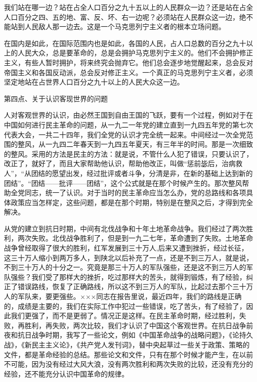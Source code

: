 我们站在哪一边？站在占全人口百分之九十五以上的人民群众一边？还是站在占全人口百分之四、五的地、富、反、坏、右一边呢？必须站在人民群众这一边，绝不能站到人民敌人那一边去。这是一个马克思列宁主义者的根本立场问题。

在国内是如此，在国际范围内也是如此，各国的人民，占人口总数的百分之九十以上的人民大众，总是要革命的，总是会拥护马克思列宁主义的。他们不会拥护修正主义，有些人暂时拥护，将来终究会抛弃它。他们总会逐步地觉醒起来，总会反对帝国主义和各国反动派，总会反对修正主义。一个真正的马克思列宁主义者，必须坚定地站在占世界人口百分之九十以上的人民大众这一边。

第四点、关于认识客现世界的问题

人对客观世界的认识，由必然王国到自由王国的飞跃，要有一个过程，例如对于在中国如何进行民主革命的问题，从一九二一年党的建立直到一九四五年党的第七次代表大会，一共二十四年，我们全党的认识才完全统一起来。中间经过一次全党范围的整风，从一九四二年春天到一九四五年夏天，有三年半的时间。那是一次细致的整风。采用的方法是民主的方法：就是说，不管什么人犯了错误，只要认识了，改正了，就好了，而且大家帮助他认识，帮助他改正，叫做“惩前毖后，治病救人”，“从团结的愿望出发，经过批评或者斗争，分清是非，在新的基础上达到新的团结”。“团结——批评——团结”，这个公式就是在那个时候产生的。那次整风帮助全党同志，统一了认识。对于当时的民主革命应当怎么办，党的总路线和各项具体政策应当怎样定，这些问题，都是在那个时期，特别是在整风之后，才得到完全解决。

从党的建立到抗日时期，中间有北伐战争和十年土地革命战争。我们经过了两次胜利，两次失败。北伐战争胜利了，但是到一九二七年，革命遭到了失败。土地革命战争曾经取得了很大的胜利，红军发展到三十万人,后来又遭到挫折，经过长征，这三十万人缩小到两万多人，到陕北以后补充了一点，还是不到三万人，就是说，不到三十万人的十分之一。究竟是那三十万人的军队强些，还是这不到三万人的军队强些？我们受了那样大的挫折，吃过那样大的苦头，就得到锻炼，有了经验，纠正了错误路线，恢复了正确路线，所以这不到三万人的军队，比起过去那个三十万人的军队来，要更强些。×××同志在报告里说，最近四年，我们的路线是正确的，成绩是主要的，我们在实际工作中犯过一些错误，吃了苦头，有了经验了，因此我们更强了，而不是更弱了。情况正是这样。在民主革命时期，经过胜利，失败，再胜利，再失败，两次比较，我们才认识了中国这个客观世界。在抗日战争前夜和抗日战争时期，我写了一些论文，例如《中国革命战争的战略问题》，《论持久战》，《新民主主义论》，《共产党人发刊词》，替中央起草过一些关于政策、策略的文件，都是革命经验的总结。那些论文和文件，只有在那个时候才能产生，在以前不可能，因为没有经过大风大浪，没有两次胜利和两次失败的比较，还没有充分的经验，还不能充分认识中国革命的规律。

